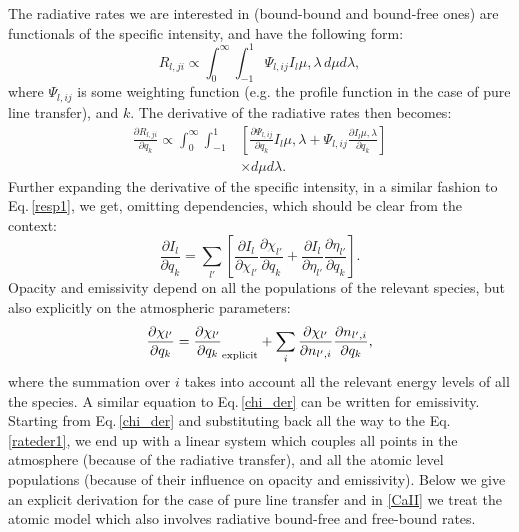 \documentclass[referee]{aa}
\begin{document}
The radiative rates we are interested in (bound-bound and bound-free ones) are functionals of the specific intensity, and have the following form:
\begin{equation}
 R_{l,ji} \propto \int_0^{\infty} \int_{-1}^{1} \Psi_{l,ij} I_l{\mu,\lambda}\,d\mu d\lambda,
\end{equation}
where $\Psi_{l,ij}$ is some weighting function (e.g. the profile function in the case of pure line transfer), and $k$. The derivative of the radiative rates then becomes: 
\begin{align}
 \frac{\partial R_{l,ji}}{\partial q_k} \propto \int_0^{\infty} \int_{-1}^{1} & \left [ \frac{\partial\Psi_{l,ij}}{\partial q_k} I_l{\mu,\lambda} + \Psi_{l,ij} \frac{\partial I_l{\mu,\lambda}}{\partial q_k} \right ] \nonumber \\
 & \times d\mu d\lambda.
\end{align}
Further expanding the derivative of the specific intensity, in a similar fashion to Eq.\,\ref{resp1}, we get, omitting dependencies, which should be clear from the context:
\begin{equation}
 \frac{\partial I_l}{\partial q_k} = \sum_{l'} \left[ \frac{\partial I_l}{\partial \chi_{l'}} \frac{\partial\chi_{l'}}{\partial q_k} + \frac{\partial I_l}{\partial \eta_{l'}} \frac{\partial\eta_{l'}}{\partial q_k} \right ].
\end{equation}
Opacity and emissivity depend on all the populations of the relevant species, but also explicitly on the atmospheric parameters:
\begin{equation}
\frac{\partial\chi_{l'}}{\partial q_k} = \frac{\partial\chi_{l'}}{\partial q_k}_{\rm{explicit}} + \sum_i \frac{\partial\chi_{l'}}{\partial n_{l',i}} \frac{\partial n_{l',i}}{\partial q_k},
\label{chi_der}
\end{equation}
where the summation over $i$ takes into account all the relevant energy levels of all the species. A similar equation to Eq.\,\ref{chi_der} can be written for emissivity. Starting from Eq.\,\ref{chi_der} and substituting back all the way to the Eq.\,\ref{rateder1}, we end up with a linear system which couples all points in the atmosphere (because of the radiative transfer), and all the atomic level populations (because of their influence on opacity and emissivity). Below we give an explicit derivation for the case of pure line transfer and in \ref{CaII} we treat the atomic model which also involves radiative bound-free and free-bound rates.
\end{document}
